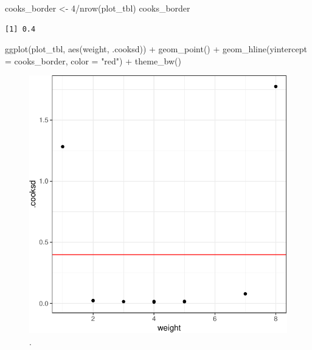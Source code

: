 \documentclass[
  letterpaper,
]{scrbook}
\newenvironment{Shaded}{\begin{snugshade}}{\end{snugshade}}
\newcommand{\AttributeTok}[1]{\textcolor[rgb]{0.40,0.45,0.13}{#1}}
\newcommand{\DecValTok}[1]{\textcolor[rgb]{0.68,0.00,0.00}{#1}}
\newcommand{\FunctionTok}[1]{\textcolor[rgb]{0.28,0.35,0.67}{#1}}
\newcommand{\NormalTok}[1]{\textcolor[rgb]{0.00,0.23,0.31}{#1}}
\newcommand{\OtherTok}[1]{\textcolor[rgb]{0.00,0.23,0.31}{#1}}
\newcommand{\SpecialCharTok}[1]{\textcolor[rgb]{0.37,0.37,0.37}{#1}}
\newcommand{\StringTok}[1]{\textcolor[rgb]{0.13,0.47,0.30}{#1}}
\begin{document}
\begin{Shaded}
\begin{Highlighting}[]
\NormalTok{cooks\_border }\OtherTok{\textless{}{-}} \DecValTok{4}\SpecialCharTok{/}\FunctionTok{nrow}\NormalTok{(plot\_tbl)}
\NormalTok{cooks\_border}
\end{Highlighting}
\end{Shaded}

\begin{verbatim}
[1] 0.4
\end{verbatim}

\begin{Shaded}
\begin{Highlighting}[]
\FunctionTok{ggplot}\NormalTok{(plot\_tbl, }\FunctionTok{aes}\NormalTok{(weight, .cooksd)) }\SpecialCharTok{+}
  \FunctionTok{geom\_point}\NormalTok{() }\SpecialCharTok{+}
  \FunctionTok{geom\_hline}\NormalTok{(}\AttributeTok{yintercept =}\NormalTok{ cooks\_border, }\AttributeTok{color =} \StringTok{"red"}\NormalTok{) }\SpecialCharTok{+}
  \FunctionTok{theme\_bw}\NormalTok{()}
\end{Highlighting}
\end{Shaded}

\begin{figure}[H]

{\centering \includegraphics{./stat-modeling-outlier_files/figure-pdf/fig-cook-2-1.pdf}

}

\caption{\label{fig-cook-2}.}

\end{figure}
\end{document}
